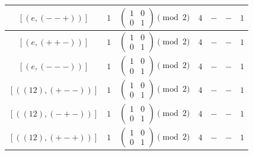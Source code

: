 \documentclass[11pt,english]{amsart}
\numberwithin{equation}{section}
\numberwithin{figure}{section}
\theoremstyle{plain}
\theoremstyle{plain}
\theoremstyle{definition}
\theoremstyle{remark}
\begin{document}
\begin{itemize}
\begin{table}[H]
\begin{tabular}{|c|c|c|c|c|c|c|}
        $[ (e, (--+)) ]$ & $1$ & $\begin{pmatrix} 1 & 0 \\ 0 & 1 \end{pmatrix}\pmod 2$ & $4$ & 
        $-$ & $-$ & $1$ \\\hline
        
        $[ (e, (++-)) ]$ & $1$ & $\begin{pmatrix} 1 & 0 \\ 0 & 1 \end{pmatrix}\pmod 2$ & $4$ & 
        $-$ & $-$ & $1$ \\\hline
        
        $[ (e, (---)) ]$ & $1$ & $\begin{pmatrix} 1 & 0 \\ 0 & 1 \end{pmatrix}\pmod 2$ & $4$ & 
        $-$ & $-$ & $1$ \\\hline
        
        $[ ((12), (+--)) ]$ & $1$ & $\begin{pmatrix} 1 & 0 \\ 0 & 1 \end{pmatrix}\pmod 2$ & $4$ & 
        $-$ & $-$ & $1$ \\\hline
        
        $[ ((12), (-+-)) ]$ & $1$ & $\begin{pmatrix} 1 & 0 \\ 0 & 1 \end{pmatrix}\pmod 2$ & $4$ & 
        $-$ & $-$ & $1$ \\\hline
        
        $[ ((12), (+-+)) ]$ & $1$ & $\begin{pmatrix} 1 & 0 \\ 0 & 1 \end{pmatrix}\pmod 2$ & $4$ & 
        $-$ & $-$ & $1$ \\\hline
        

\end{tabular}
\end{table}
\end{itemize}
\end{document}
